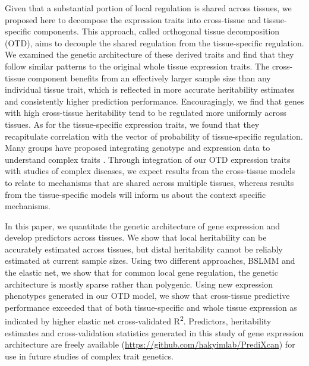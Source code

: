 \documentclass[10pt,letterpaper]{article}
\begin{document}
Given that a substantial portion of local regulation is shared across tissues, we proposed here to decompose the expression traits into cross-tissue and tissue-specific components. This approach, called orthogonal tissue decomposition (OTD), aims to decouple the shared regulation from the tissue-specific regulation. We examined the genetic architecture of these derived traits and find that they follow similar patterns to the original whole tissue expression traits. The cross-tissue component benefits from an effectively larger sample size than any individual tissue trait, which is reflected in more accurate heritability estimates and consistently higher prediction performance. Encouragingly, we find that genes with high cross-tissue heritability tend to be regulated more uniformly across tissues. As for the tissue-specific expression traits, we found that they recapitulate correlation with the vector of probability of tissue-specific regulation. Many groups have proposed integrating genotype and expression data to understand complex traits \cite{Gamazon_2015,giambartolomei2014bayesian,gusev2016integrative,he2013sherlock,Wheeler_2014,zhu2016integration}. Through integration of our OTD expression traits with studies of complex diseases, we expect results from the cross-tissue models to relate to mechanisms that are shared across multiple tissues, whereas results from the tissue-specific models will inform us about the context specific mechanisms. 

In this paper, we quantitate the genetic architecture of gene expression and develop predictors across tissues. We show that local heritability can be accurately estimated across tissues, but distal heritability cannot be reliably estimated at current sample sizes. Using two different approaches, BSLMM and the elastic net, we show that for common local gene regulation, the genetic architecture is mostly sparse rather than polygenic. Using new expression phenotypes generated in our OTD model, we show that cross-tissue predictive performance exceeded that of both tissue-specific and whole tissue expression as indicated by higher elastic net cross-validated R\textsuperscript{2}. Predictors, heritability estimates and cross-validation statistics generated in this study of gene expression architecture are freely available (\url{https://github.com/hakyimlab/PrediXcan}) for use in future studies of complex trait genetics.


\end{document}
